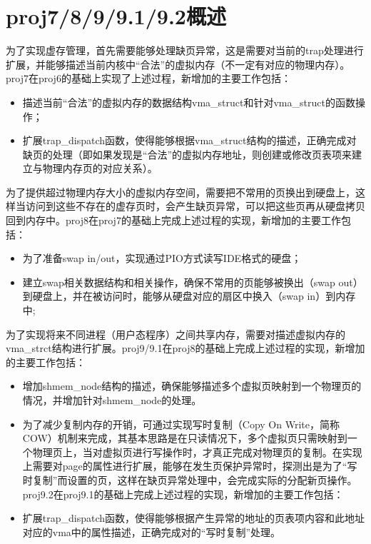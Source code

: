 \section{proj7/8/9/9.1/9.2概述}\label{proj7899.19.2ux6982ux8ff0}

为了实现虚存管理，首先需要能够处理缺页异常，这是需要对当前的trap处理进行扩展，并能够描述当前内核中``合法''的虚拟内存（不一定有对应的物理内存）。proj7在proj6的基础上实现了上述过程，新增加的主要工作包括：

\begin{itemize}
\tightlist
\item
  描述当前``合法''的虚拟内存的数据结构vma\_struct和针对vma\_struct的函数操作；
\item
  扩展trap\_dispatch函数，使得能够根据vma\_struct结构的描述，正确完成对缺页的处理（即如果发现是``合法''的虚拟内存地址，则创建或修改页表项来建立与物理内存页的对应关系）。
\end{itemize}

为了提供超过物理内存大小的虚拟内存空间，需要把不常用的页换出到硬盘上，这样当访问到这些不存在的虚存页时，会产生缺页异常，可以把这些页再从硬盘拷贝回到内存中。proj8在proj7的基础上完成上述过程的实现，新增加的主要工作包括：

\begin{itemize}
\tightlist
\item
  为了准备swap in/out，实现通过PIO方式读写IDE格式的硬盘；
\item
  建立swap相关数据结构和相关操作，确保不常用的页能够被换出（swap
  out）到硬盘上，并在被访问时，能够从硬盘对应的扇区中换入（swap
  in）到内存中;
\end{itemize}

为了实现将来不同进程（用户态程序）之间共享内存，需要对描述虚拟内存的vma\_strct结构进行扩展。proj9/9.1在proj8的基础上完成上述过程的实现，新增加的主要工作包括：

\begin{itemize}
\item
  增加shmem\_node结构的描述，确保能够描述多个虚拟页映射到一个物理页的情况，并增加针对shmem\_node的处理。
\item
  为了减少复制内存的开销，可通过实现写时复制（Copy On
  Write，简称COW）机制来完成，其基本思路是在只读情况下，多个虚拟页只需映射到一个物理页上，当对虚拟页进行写操作时，才真正完成对物理页的复制。在实现上需要对page的属性进行扩展，能够在发生页保护异常时，探测出是为了``写时复制''而设置的页，这样在缺页异常处理中，会完成实际的分配新页操作。proj9.2在proj9.1的基础上完成上述过程的实现，新增加的主要工作包括：
\item
  扩展trap\_dispatch函数，使得能够根据产生异常的地址的页表项内容和此地址对应的vma中的属性描述，正确完成对的``写时复制''处理。
\end{itemize}
